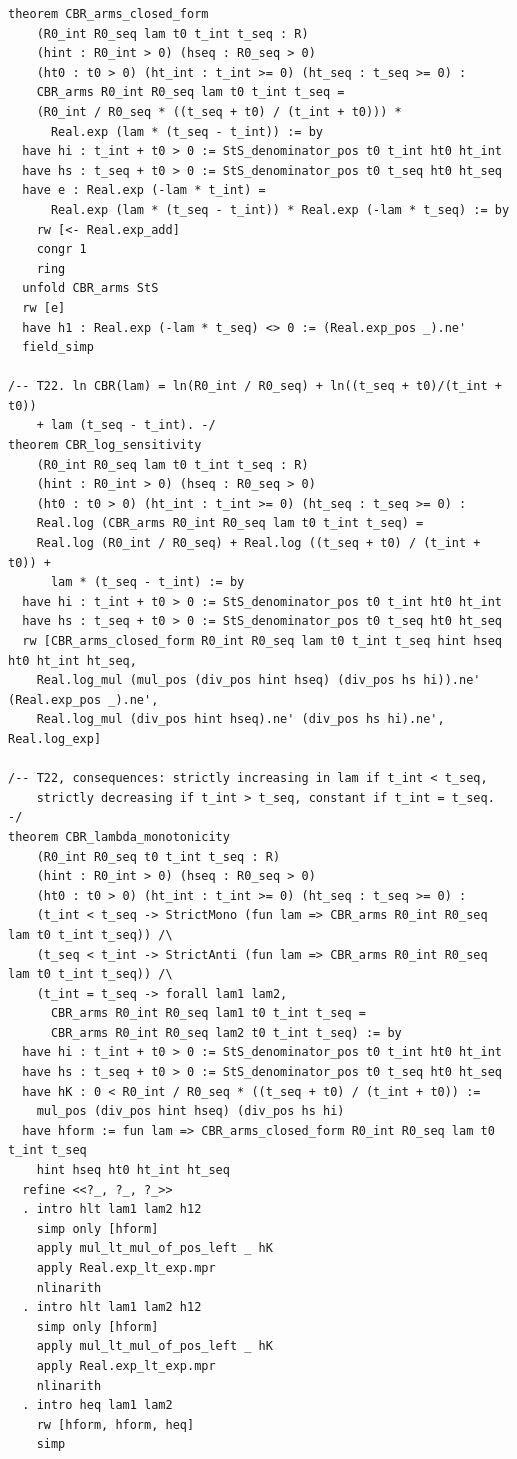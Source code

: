 \documentclass[11pt,a4paper]{article}
\begin{document}
\begin{lstlisting}
theorem CBR_arms_closed_form
    (R0_int R0_seq lam t0 t_int t_seq : R)
    (hint : R0_int > 0) (hseq : R0_seq > 0)
    (ht0 : t0 > 0) (ht_int : t_int >= 0) (ht_seq : t_seq >= 0) :
    CBR_arms R0_int R0_seq lam t0 t_int t_seq =
    (R0_int / R0_seq * ((t_seq + t0) / (t_int + t0))) *
      Real.exp (lam * (t_seq - t_int)) := by
  have hi : t_int + t0 > 0 := StS_denominator_pos t0 t_int ht0 ht_int
  have hs : t_seq + t0 > 0 := StS_denominator_pos t0 t_seq ht0 ht_seq
  have e : Real.exp (-lam * t_int) =
      Real.exp (lam * (t_seq - t_int)) * Real.exp (-lam * t_seq) := by
    rw [<- Real.exp_add]
    congr 1
    ring
  unfold CBR_arms StS
  rw [e]
  have h1 : Real.exp (-lam * t_seq) <> 0 := (Real.exp_pos _).ne'
  field_simp

/-- T22. ln CBR(lam) = ln(R0_int / R0_seq) + ln((t_seq + t0)/(t_int + t0))
    + lam (t_seq - t_int). -/
theorem CBR_log_sensitivity
    (R0_int R0_seq lam t0 t_int t_seq : R)
    (hint : R0_int > 0) (hseq : R0_seq > 0)
    (ht0 : t0 > 0) (ht_int : t_int >= 0) (ht_seq : t_seq >= 0) :
    Real.log (CBR_arms R0_int R0_seq lam t0 t_int t_seq) =
    Real.log (R0_int / R0_seq) + Real.log ((t_seq + t0) / (t_int + t0)) +
      lam * (t_seq - t_int) := by
  have hi : t_int + t0 > 0 := StS_denominator_pos t0 t_int ht0 ht_int
  have hs : t_seq + t0 > 0 := StS_denominator_pos t0 t_seq ht0 ht_seq
  rw [CBR_arms_closed_form R0_int R0_seq lam t0 t_int t_seq hint hseq ht0 ht_int ht_seq,
    Real.log_mul (mul_pos (div_pos hint hseq) (div_pos hs hi)).ne' (Real.exp_pos _).ne',
    Real.log_mul (div_pos hint hseq).ne' (div_pos hs hi).ne', Real.log_exp]

/-- T22, consequences: strictly increasing in lam if t_int < t_seq,
    strictly decreasing if t_int > t_seq, constant if t_int = t_seq. -/
theorem CBR_lambda_monotonicity
    (R0_int R0_seq t0 t_int t_seq : R)
    (hint : R0_int > 0) (hseq : R0_seq > 0)
    (ht0 : t0 > 0) (ht_int : t_int >= 0) (ht_seq : t_seq >= 0) :
    (t_int < t_seq -> StrictMono (fun lam => CBR_arms R0_int R0_seq lam t0 t_int t_seq)) /\
    (t_seq < t_int -> StrictAnti (fun lam => CBR_arms R0_int R0_seq lam t0 t_int t_seq)) /\
    (t_int = t_seq -> forall lam1 lam2,
      CBR_arms R0_int R0_seq lam1 t0 t_int t_seq =
      CBR_arms R0_int R0_seq lam2 t0 t_int t_seq) := by
  have hi : t_int + t0 > 0 := StS_denominator_pos t0 t_int ht0 ht_int
  have hs : t_seq + t0 > 0 := StS_denominator_pos t0 t_seq ht0 ht_seq
  have hK : 0 < R0_int / R0_seq * ((t_seq + t0) / (t_int + t0)) :=
    mul_pos (div_pos hint hseq) (div_pos hs hi)
  have hform := fun lam => CBR_arms_closed_form R0_int R0_seq lam t0 t_int t_seq
    hint hseq ht0 ht_int ht_seq
  refine <<?_, ?_, ?_>>
  . intro hlt lam1 lam2 h12
    simp only [hform]
    apply mul_lt_mul_of_pos_left _ hK
    apply Real.exp_lt_exp.mpr
    nlinarith
  . intro hlt lam1 lam2 h12
    simp only [hform]
    apply mul_lt_mul_of_pos_left _ hK
    apply Real.exp_lt_exp.mpr
    nlinarith
  . intro heq lam1 lam2
    rw [hform, hform, heq]
    simp


\end{lstlisting}
\end{document}
